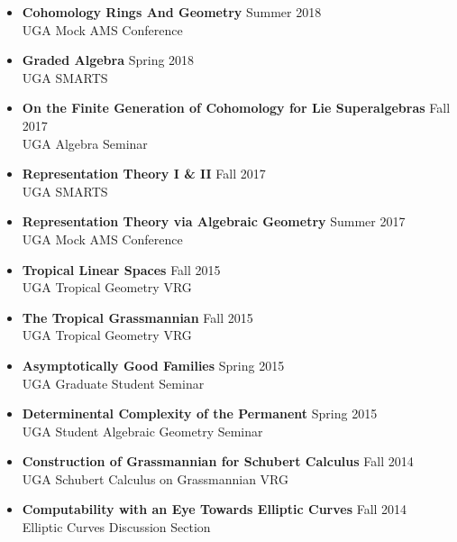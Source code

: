 \documentclass[letterpaper,11pt]{article}
\begin{document}
\begin{itemize}
\item \textbf{Cohomology Rings And Geometry} \hfill Summer 2018 \\
       UGA Mock AMS Conference
 \item \textbf{Graded Algebra} \hfill Spring 2018 \\
       UGA SMARTS 
 \item \textbf{On the Finite Generation of Cohomology for Lie Superalgebras} \hfill Fall 2017 \\
       UGA Algebra Seminar
 \item \textbf{Representation Theory I \& II} \hfill Fall 2017 \\
       UGA SMARTS 
 \item \textbf{Representation Theory via Algebraic Geometry} \hfill Summer 2017 \\
       UGA Mock AMS Conference 
 \item \textbf{Tropical Linear Spaces} \hfill Fall 2015 \\
       UGA Tropical Geometry VRG
 \item \textbf{The Tropical Grassmannian} \hfill Fall 2015 \\
       UGA Tropical Geometry VRG
 \item \textbf{Asymptotically Good Families} \hfill Spring 2015 \\
       UGA Graduate Student Seminar
 \item \textbf{Determinental Complexity of the Permanent} \hfill Spring 2015 \\
       UGA Student Algebraic Geometry Seminar
 \item \textbf{Construction of Grassmannian for Schubert Calculus} \hfill Fall 2014 \\
       UGA Schubert Calculus on Grassmannian VRG 
 \item \textbf{Computability with an Eye Towards Elliptic Curves} \hfill Fall 2014 \\
       Elliptic Curves Discussion Section
\end{itemize}
\end{document}

